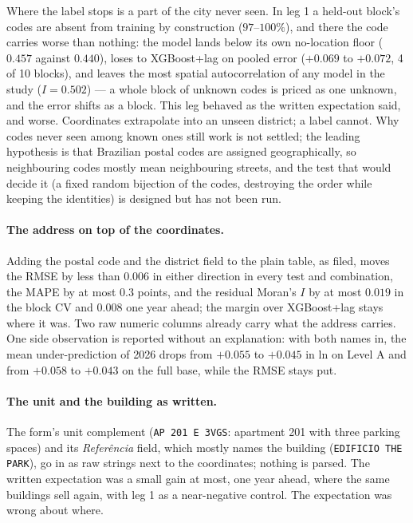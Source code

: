 \documentclass[11pt,a4paper]{article}
\begin{document}
Where the label stops is a part of the city never seen. In leg 1 a held-out block's codes are
absent from training by construction ($97$--$100\%$), and there the code carries worse than
nothing: the model lands below its own no-location floor ($0.457$ against $0.440$), loses to
XGBoost+lag on pooled error ($+0.069$ to $+0.072$, 4 of 10 blocks), and leaves the most spatial
autocorrelation of any model in the study ($I = 0.502$) --- a whole block of unknown codes is
priced as one unknown, and the error shifts as a block. This leg behaved as the written
expectation said, and worse. Coordinates extrapolate into an unseen district; a label cannot.
Why codes never seen among known ones still work is not settled; the leading hypothesis is that
Brazilian postal codes are assigned geographically, so neighbouring codes mostly mean
neighbouring streets, and the test that would decide it (a fixed random bijection of the codes,
destroying the order while keeping the identities) is designed but has not been run.

\paragraph{The address on top of the coordinates.} Adding the postal code and the district field
to the plain table, as filed, moves the RMSE by less than $0.006$ in either direction in every
test and combination, the MAPE by at most $0.3$ points, and the residual Moran's $I$ by at most
$0.019$ in the block CV and $0.008$ one year ahead; the margin over XGBoost+lag stays where it
was. Two raw numeric columns already carry what the
address carries. One side observation is reported without an explanation: with both names in,
the mean under-prediction of 2026 drops from $+0.055$ to $+0.045$ in ln on Level A and from
$+0.058$ to $+0.043$ on the full base, while the RMSE stays put.

\paragraph{The unit and the building as written.} The form's unit complement
(\texttt{AP 201 E 3VGS}: apartment 201 with three parking spaces) and its \emph{Referência}
field, which mostly names the building (\texttt{EDIFICIO THE PARK}), go in as raw strings next
to the coordinates; nothing is parsed. The written expectation was a small gain at most, one
year ahead, where the same buildings sell again, with leg 1 as a near-negative control. The
expectation was wrong about where.
\end{document}
